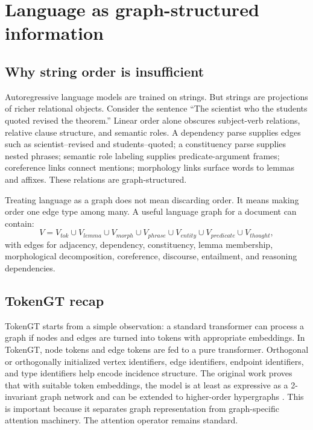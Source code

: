 \documentclass[11pt]{article}
\newcommand{\1}{\mathbf{1}}
\begin{document}
\section{Language as graph-structured information}

\subsection{Why string order is insufficient}

Autoregressive language models are trained on strings. But strings are projections of richer relational objects. Consider the sentence ``The scientist who the students quoted revised the theorem.'' Linear order alone obscures subject-verb relations, relative clause structure, and semantic roles. A dependency parse supplies edges such as scientist--revised and students--quoted; a constituency parse supplies nested phrases; semantic role labeling supplies predicate-argument frames; coreference links connect mentions; morphology links surface words to lemmas and affixes. These relations are graph-structured.

Treating language as a graph does not mean discarding order. It means making order one edge type among many. A useful language graph for a document can contain:
\[
V=V_{tok}\cup V_{lemma}\cup V_{morph}\cup V_{phrase}\cup V_{entity}\cup V_{predicate}\cup V_{thought},
\]
with edges for adjacency, dependency, constituency, lemma membership, morphological decomposition, coreference, discourse, entailment, and reasoning dependencies.

\subsection{TokenGT recap}

TokenGT starts from a simple observation: a standard transformer can process a graph if nodes and edges are turned into tokens with appropriate embeddings. In TokenGT, node tokens and edge tokens are fed to a pure transformer. Orthogonal or orthogonally initialized vertex identifiers, edge identifiers, endpoint identifiers, and type identifiers help encode incidence structure. The original work proves that with suitable token embeddings, the model is at least as expressive as a 2-invariant graph network and can be extended to higher-order hypergraphs \cite{KimTokenGT2022}. This is important because it separates graph representation from graph-specific attention machinery. The attention operator remains standard.
\end{document}

